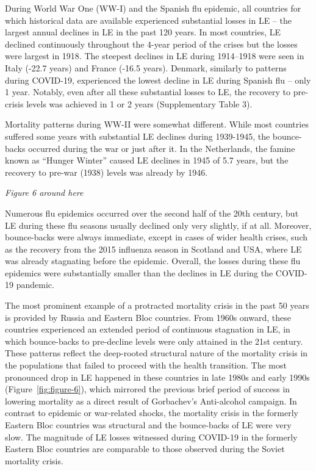\documentclass[12pt]{article}
\begin{document}
During World War One (WW-I) and the Spanish flu epidemic, all countries for which historical data are available experienced substantial losses in LE -- the largest annual declines in LE in the past 120 years. In most countries, LE declined continuously throughout the 4-year period of the crises but the losses were largest in 1918. The steepest declines in LE during 1914--1918 were seen in Italy (-22.7 years) and France (-16.5 years). Denmark, similarly to patterns during COVID-19, experienced the lowest decline in LE during Spanish flu -- only 1 year. Notably, even after all these substantial losses to LE, the recovery to pre-crisis levels was achieved in 1 or 2 years (Supplementary Table 3).

Mortality patterns during WW-II were somewhat different. While most countries suffered some years with substantial LE declines during 1939-1945, the bounce-backs occurred during the war or just after it. In the Netherlands, the famine known as ``Hunger Winter'' caused LE declines in 1945 of 5.7 years, but the recovery to pre-war (1938) levels was already  by 1946.\cite{Lumey1994}

\par\medskip
\emph{Figure 6 around here}
\par\medskip

Numerous flu epidemics occurred over the second half of the 20th century, but  LE during these flu seasons usually declined only very slightly, if at all. Moreover, bounce-backs were always immediate, except in cases of wider health crises, such as the recovery from the 2015 influenza season in Scotland and USA, where LE was already stagnating before the epidemic\cite{Fenton2019}. Overall, the losses during these flu epidemics were substantially smaller than the declines in LE during the COVID-19 pandemic.

The most prominent example of a protracted mortality crisis in the past 50 years is provided by Russia and Eastern Bloc countries. From 1960s onward, these countries experienced an extended period of continuous stagnation in LE, in which bounce-backs to pre-decline levels were only attained in the 21st century.\cite{Shkolnikov2013} These patterns reflect the deep-rooted structural nature of the mortality crisis in the populations that failed to proceed with the health transition.\cite{Timonin2016} The most pronounced drop in LE happened in these countries in late 1980s and early 1990s (Figure~\ref{fig:figure-6}), which mirrored the previous brief period of success in lowering mortality\cite{Zakharov1999} as a direct result of Gorbachev's Anti-alcohol campaign.\cite{Leon2009} In contrast to epidemic or war-related shocks, the mortality crisis in the formerly Eastern Bloc countries was structural and the bounce-backs of LE were very slow. The magnitude of LE losses witnessed during COVID-19 in the formerly Eastern Bloc countries are comparable to those observed during the Soviet mortality crisis.
\end{document}
